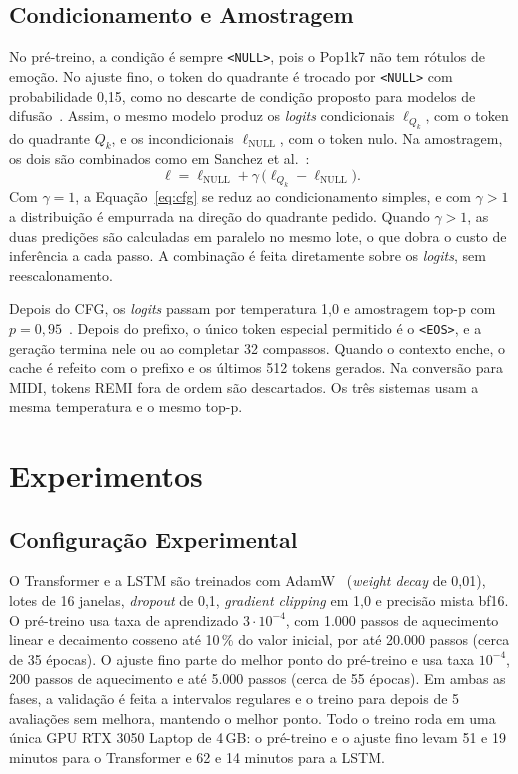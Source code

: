 \documentclass{article}
\begin{document}
\subsection{Condicionamento e Amostragem}

No pré-treino, a condição é sempre \texttt{<NULL>}, pois o Pop1k7 não tem
rótulos de emoção. No ajuste fino, o token do quadrante é trocado por
\texttt{<NULL>} com probabilidade 0,15, como no descarte de condição proposto
para modelos de difusão~\cite{Ho2021:cfg}. Assim, o mesmo modelo produz os
\emph{logits} condicionais $\ell_{Q_k}$, com o token do quadrante $Q_k$, e os
incondicionais $\ell_{\text{NULL}}$, com o token nulo. Na amostragem, os dois
são combinados como em Sanchez et al.~\cite{Sanchez2024:cfg}:
\begin{equation}
  \ell = \ell_{\text{NULL}} + \gamma\,\bigl(\ell_{Q_k} -
  \ell_{\text{NULL}}\bigr).
  \label{eq:cfg}
\end{equation}
Com $\gamma = 1$, a Equação~\ref{eq:cfg} se reduz ao condicionamento simples, e
com $\gamma > 1$ a distribuição é empurrada na direção do quadrante pedido.
Quando $\gamma > 1$, as duas predições são calculadas em paralelo no mesmo lote,
o que dobra o custo de inferência a cada passo. A combinação é feita diretamente
sobre os \emph{logits}, sem reescalonamento.

Depois do CFG, os \emph{logits} passam por temperatura 1,0 e amostragem top-p
com $p = 0{,}95$~\cite{Holtzman2020:topp}. Depois do prefixo, o único token
especial permitido é o \texttt{<EOS>}, e a geração termina nele ou ao completar
32 compassos. Quando o contexto enche, o cache é refeito com o prefixo e os
últimos 512 tokens gerados. Na conversão para MIDI, tokens REMI fora de ordem
são descartados. Os três sistemas usam a mesma temperatura e o mesmo top-p.

\section{Experimentos}\label{sec:experiments}

\subsection{Configuração Experimental}

O Transformer e a LSTM são treinados com AdamW~\cite{Loshchilov2019:adamw}
(\emph{weight decay} de 0,01), lotes de 16 janelas, \emph{dropout} de 0,1,
\emph{gradient clipping} em 1,0 e precisão mista bf16. O pré-treino usa taxa de
aprendizado $3 \cdot 10^{-4}$, com 1.000 passos de aquecimento linear e
decaimento cosseno até 10\,\% do valor inicial, por até 20.000 passos (cerca de
35 épocas). O ajuste fino parte do melhor ponto do pré-treino e usa taxa
$10^{-4}$, 200 passos de aquecimento e até 5.000 passos (cerca de 55 épocas). Em
ambas as fases, a validação é feita a intervalos regulares e o treino para
depois de 5 avaliações sem melhora, mantendo o melhor ponto. Todo o treino roda
em uma única GPU RTX 3050 Laptop de 4\,GB: o pré-treino e o ajuste fino levam
51 e 19 minutos para o Transformer e 62 e 14 minutos para a LSTM.
\end{document}
